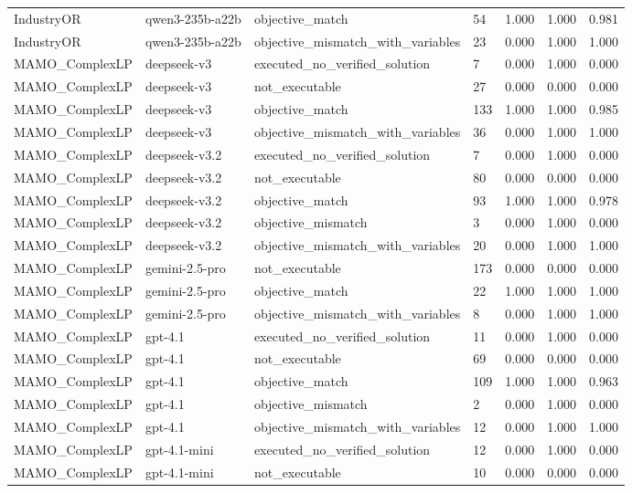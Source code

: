 \begin{table}[t]
\begin{tabular}{lllllll}
IndustryOR & qwen3-235b-a22b & objective\_match & 54 & 1.000 & 1.000 & 0.981 \\
IndustryOR & qwen3-235b-a22b & objective\_mismatch\_with\_variables & 23 & 0.000 & 1.000 & 1.000 \\
MAMO\_ComplexLP & deepseek-v3 & executed\_no\_verified\_solution & 7 & 0.000 & 1.000 & 0.000 \\
MAMO\_ComplexLP & deepseek-v3 & not\_executable & 27 & 0.000 & 0.000 & 0.000 \\
MAMO\_ComplexLP & deepseek-v3 & objective\_match & 133 & 1.000 & 1.000 & 0.985 \\
MAMO\_ComplexLP & deepseek-v3 & objective\_mismatch\_with\_variables & 36 & 0.000 & 1.000 & 1.000 \\
MAMO\_ComplexLP & deepseek-v3.2 & executed\_no\_verified\_solution & 7 & 0.000 & 1.000 & 0.000 \\
MAMO\_ComplexLP & deepseek-v3.2 & not\_executable & 80 & 0.000 & 0.000 & 0.000 \\
MAMO\_ComplexLP & deepseek-v3.2 & objective\_match & 93 & 1.000 & 1.000 & 0.978 \\
MAMO\_ComplexLP & deepseek-v3.2 & objective\_mismatch & 3 & 0.000 & 1.000 & 0.000 \\
MAMO\_ComplexLP & deepseek-v3.2 & objective\_mismatch\_with\_variables & 20 & 0.000 & 1.000 & 1.000 \\
MAMO\_ComplexLP & gemini-2.5-pro & not\_executable & 173 & 0.000 & 0.000 & 0.000 \\
MAMO\_ComplexLP & gemini-2.5-pro & objective\_match & 22 & 1.000 & 1.000 & 1.000 \\
MAMO\_ComplexLP & gemini-2.5-pro & objective\_mismatch\_with\_variables & 8 & 0.000 & 1.000 & 1.000 \\
MAMO\_ComplexLP & gpt-4.1 & executed\_no\_verified\_solution & 11 & 0.000 & 1.000 & 0.000 \\
MAMO\_ComplexLP & gpt-4.1 & not\_executable & 69 & 0.000 & 0.000 & 0.000 \\
MAMO\_ComplexLP & gpt-4.1 & objective\_match & 109 & 1.000 & 1.000 & 0.963 \\
MAMO\_ComplexLP & gpt-4.1 & objective\_mismatch & 2 & 0.000 & 1.000 & 0.000 \\
MAMO\_ComplexLP & gpt-4.1 & objective\_mismatch\_with\_variables & 12 & 0.000 & 1.000 & 1.000 \\
MAMO\_ComplexLP & gpt-4.1-mini & executed\_no\_verified\_solution & 12 & 0.000 & 1.000 & 0.000 \\
MAMO\_ComplexLP & gpt-4.1-mini & not\_executable & 10 & 0.000 & 0.000 & 0.000 \\

\end{tabular}
\end{table}
